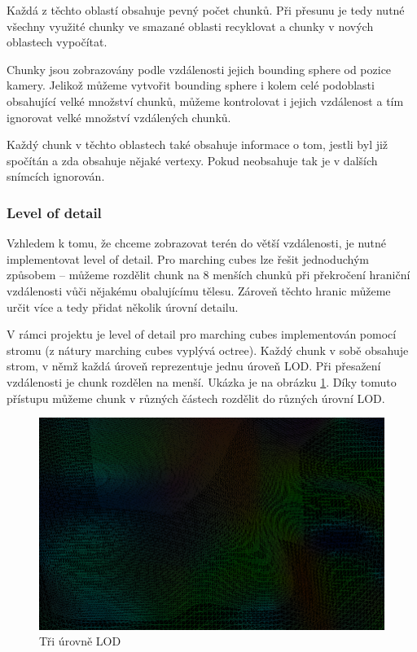 \documentclass[12pt,a4paper,titlepage,final]{report}
\begin{document}
Každá z těchto oblastí obsahuje pevný počet chunků. Při přesunu je tedy nutné všechny využité chunky ve smazané oblasti recyklovat a chunky v nových oblastech vypočítat. 

Chunky jsou zobrazovány podle vzdálenosti jejich bounding sphere od pozice kamery. Jelikož můžeme vytvořit bounding sphere i kolem celé podoblasti obsahující velké množství chunků, můžeme kontrolovat i jejich vzdálenost a tím ignorovat velké množství vzdálených chunků.

Každý chunk v těchto oblastech také obsahuje informace o tom, jestli byl již spočítán a zda obsahuje nějaké vertexy. Pokud neobsahuje tak je v dalších snímcích ignorován. 

\subsubsection{Level of detail}
Vzhledem k tomu, že chceme zobrazovat terén do větší vzdálenosti, je nutné implementovat level of detail. Pro marching cubes lze řešit jednoduchým způsobem -- můžeme rozdělit chunk na 8 menších chunků při překročení hraniční vzdálenosti vůči nějakému obalujícímu tělesu. Zároveň těchto hranic můžeme určit více a tedy přidat několik úrovní detailu.

V rámci projektu je level of detail pro marching cubes implementován pomocí stromu (z nátury marching cubes vyplývá octree). Každý chunk v sobě obsahuje strom, v němž každá úroveň reprezentuje jednu úroveň LOD. Při přesažení vzdálenosti je chunk rozdělen na menší. Ukázka je na obrázku \ref{fig:lod}. Díky tomuto přístupu můžeme chunk v různých částech rozdělit do různých úrovní LOD.

\begin{figure}[H]
    \centering
    \includegraphics[scale=1]{images/LOD.png}
    \caption{Tři úrovně LOD}
    \label{fig:lod}
\end{figure}
\end{document}
